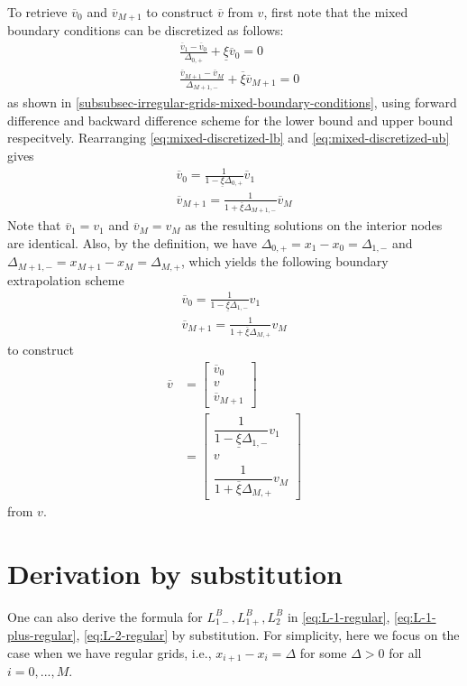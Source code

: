 \documentclass[11pt]{article}
\theoremstyle{definition}
\begin{document}
To retrieve $\overline{v}_0 $ and $\overline{v}_{M+1}$ to construct $\overline{v}$ from $v$, first note that the mixed boundary conditions can be discretized as follows:
\begin{align}
&\frac{\overline{v}_1 - \overline{v}_0}{\Delta_{0,+}} + \underline{\xi} \overline{v}_0 = 0 \label{eq:mixed-discretized-lb} \\
&\frac{\overline{v}_{M+1} - \overline{v}_M}{\Delta_{M+1,-}} + \overline{\xi} \overline{v}_{M+1} = 0 \label{eq:mixed-discretized-ub}
\end{align}
as shown in \ref{subsubsec-irregular-grids-mixed-boundary-conditions}, using forward difference and backward difference scheme for the lower bound and upper bound respecitvely. Rearranging \eqref{eq:mixed-discretized-lb} and \eqref{eq:mixed-discretized-ub} gives
\begin{align}
\overline{v}_0 = \frac{1}{1-\underline{\xi} \Delta_{0,+} } \overline{v}_1 \\
\overline{v}_{M+1} = \frac{1}{1+\overline{\xi} \Delta_{M+1,-} } \overline{v}_M
\end{align}
Note that $\overline{v}_1 = v_1$ and $\overline{v}_M = v_M$ as the resulting solutions on the interior nodes are identical. Also, by the definition, we have $\Delta_{0,+} = x_1 - x_0 = \Delta_{1,-}$ and $\Delta_{M+1,-} = x_{M+1} - x_M = \Delta_{M, +}$, which yields the following boundary extrapolation scheme
\begin{align}
\overline{v}_0 = \frac{1}{1-\underline{\xi} \Delta_{1,-} } {v}_1 \\
\overline{v}_{M+1} = \frac{1}{1+\overline{\xi} \Delta_{M,+} } {v}_M
\end{align}
to construct
\begin{align}
\overline{v} &= \begin{bmatrix}
\overline{v}_0 \\
v  \\
\overline{v}_{M+1}
\end{bmatrix} \\ &=
\begin{bmatrix}
\dfrac{1}{1-\underline{\xi} \Delta_{1,-} } {v}_1 \\
v  \\
\dfrac{1}{1+\overline{\xi} \Delta_{M,+} } {v}_M
\end{bmatrix} 
\end{align}
from $v$.

\section{Derivation by substitution}
One can also derive the formula for $L_{1-}^B, L_{1+}^B, L_2^B$ in \eqref{eq:L-1-regular}, \eqref{eq:L-1-plus-regular}, \eqref{eq:L-2-regular} by substitution. For simplicity, here we focus on the case when we have regular grids, i.e., $x_{i+1} - x_i = \Delta$ for some $\Delta > 0$ for all $i = 0, ..., M$.
\end{document}

